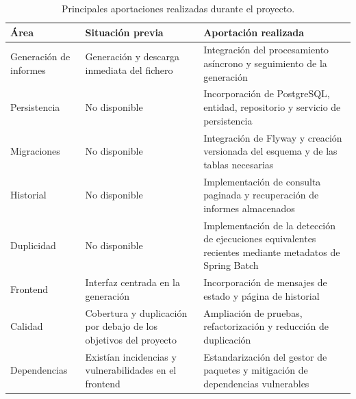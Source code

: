 \documentclass[11pt,a4paper,titlepage,oneside]{report}
\newcommand{\tfgtablestyle}{%
  \small
  \setlength{\tabcolsep}{4pt}%
  \renewcommand{\arraystretch}{1.15}%
  \rowcolors{2}{udcgray!08}{white}%
}
\begin{document}
\begin{table}[H]
  \centering
  \tfgtablestyle
  \caption{Principales aportaciones realizadas durante el proyecto.}
  \label{tab:aportacion-personal}

  \begin{tabularx}{0.97\textwidth}{@{}p{}XX@{}}

    \toprule
    \rowcolor{udcpink!20}

    \textbf{Área} &
    \textbf{Situación previa} &
    \textbf{Aportación realizada} \\

    \midrule

    Generación de informes &
    Generación y descarga inmediata del fichero &
    Integración del procesamiento asíncrono y seguimiento de la generación \\

    Persistencia &
    No disponible &
    Incorporación de PostgreSQL, entidad, repositorio y servicio de
    persistencia \\

    Migraciones &
    No disponible &
    Integración de Flyway y creación versionada del esquema y de las tablas
    necesarias \\

    Historial &
    No disponible &
    Implementación de consulta paginada y recuperación de informes
    almacenados \\

    Duplicidad &
    No disponible &
    Implementación de la detección de ejecuciones equivalentes recientes
    mediante metadatos de Spring Batch \\

    Frontend &
    Interfaz centrada en la generación &
    Incorporación de mensajes de estado y página de historial \\

    Calidad &
    Cobertura y duplicación por debajo de los objetivos del proyecto &
    Ampliación de pruebas, refactorización y reducción de duplicación \\

    Dependencias &
    Existían incidencias y vulnerabilidades en el frontend &
    Estandarización del gestor de paquetes y mitigación de dependencias
    vulnerables \\

    \bottomrule
  \end{tabularx}

\end{table}
\end{document}
